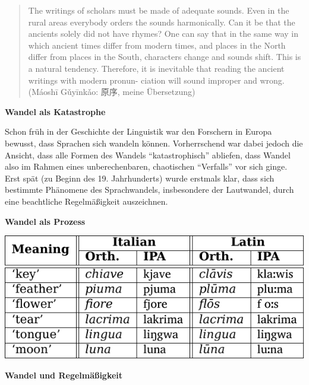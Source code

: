 \begin{quote}
The writings of scholars must be made of adequate sounds. Even in the
rural areas everybody orders the sounds harmonically. Can it be that the
ancients solely did not have rhymes? One can say that in the same way in
which ancient times differ from modern times, and places in the North
differ from places in the South, characters change and sounds shift.
This is a natural tendency. Therefore, it is inevitable that reading the
ancient writings with modern pronun- ciation will sound improper and
wrong. (Máoshī Gǔyīnkǎo: 原序, meine Übersetzung)
\end{quote}

\vspace{0.5cm}\par\noindent\textbf{Wandel als Katastrophe}\vspace{0.5cm}

Schon früh in der Geschichte der Linguistik war den Forschern in Europa
bewusst, dass Sprachen sich wandeln können. Vorherrschend war dabei
jedoch die Ansicht, dass alle Formen des Wandels ``katastrophisch''
abliefen, dass Wandel also im Rahmen eines unberechenbaren, chaotischen
``Verfalls'' vor sich ginge. Erst spät (zu Beginn des 19. Jahrhunderts)
wurde erstmals klar, dass sich bestimmte Phänomene des Sprachwandels,
insbesondere der Lautwandel, durch eine beachtliche Regelmäßigkeit
auszeichnen.

\vspace{0.5cm}\par\noindent\textbf{Wandel als Prozess}\vspace{0.5cm}

\includegraphics[width=\textwidth]{img/lautwandel-ita-lat.pdf}



\vspace{0.5cm}\par\noindent\textbf{Wandel und Regelmäßigkeit}\vspace{0.5cm}

